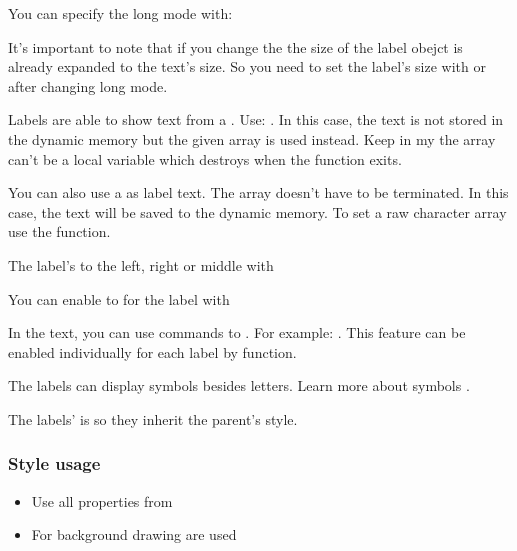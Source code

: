 \documentclass[letterpaper,10pt,english]{sphinxmanual}
\begin{document}
You can specify the long mode with: 

It’s important to note that if you change the  the size of the label obejct is already expanded to the text’s size.
So you need to set the label’s size with  or  after changing long mode.

Labels are able to show text from a . Use: . In this case, the text is not stored in the dynamic memory but the given array is used instead. Keep in my the array can’t be a local variable which destroys when the function exits.

You can also use a  as label text. The array doesn’t have to be  terminated. In this case, the text will be saved to the dynamic memory. To set a raw character array use the  function.

The label’s  to the left, right or middle with 

You can enable to  for the label with 

In the text, you can use commands to . For example: . This feature can be enabled individually for each label by  function.

The labels can display symbols besides letters. Learn more about symbols .

The labels’  is  so they inherit the parent’s style.


\subsubsection{Style usage}
\label{\detokenize{object-types/label:style-usage}}\begin{itemize}
\item {} 
Use all properties from 

\item {} 
For background drawing  are used

\end{itemize}
\end{document}
